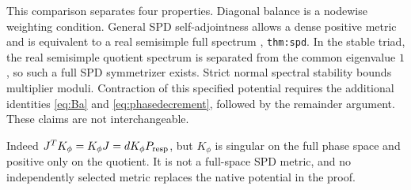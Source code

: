 This comparison separates four properties. Diagonal balance is a nodewise weighting condition. General SPD self-adjointness allows a dense positive metric and is equivalent to a real semisimple full spectrum \cite{nrg}, \texttt{thm:spd}. In the stable triad, the real semisimple quotient spectrum is separated from the common eigenvalue \(1\), so such a full SPD symmetrizer exists. Strict normal spectral stability bounds multiplier moduli. Contraction of this specified potential requires the additional identities \eqref{eq:Ba} and \eqref{eq:phasedecrement}, followed by the remainder argument. These claims are not interchangeable.

Indeed \(J^TK_\phi=K_\phi J=dK_\phi P_{\rm resp}\), but \(K_\phi\) is singular on the full phase space and positive only on the quotient. It is not a full-space SPD metric, and no independently selected metric replaces the native potential in the proof.

